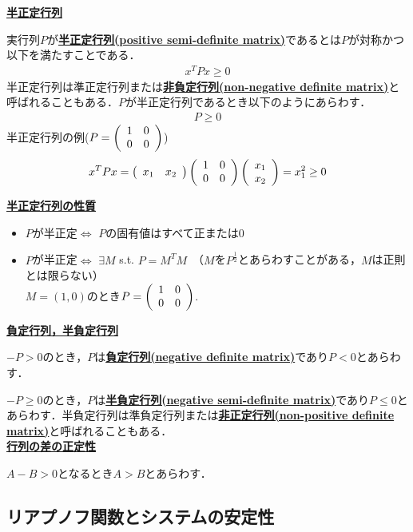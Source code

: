 \noindent
{\bf \underline{半正定行列}}

実行列$P$が{\bf \underline{半正定行列(positive semi-definite matrix)}}であるとは$P$が対称かつ以下を満たすことである．
\begin{eqnarray}
	x^T P x \geq 0
\end{eqnarray}
半正定行列は準正定行列または{\bf \underline{非負定行列(non-negative definite matrix)}}と呼ばれることもある．$P$が半正定行列であるとき以下のようにあらわす．
\begin{eqnarray}
	P \geq 0
\end{eqnarray}
半正定行列の例($ P = \bmatrix{cc} 1 & 0 \\ 0 & 0 \ematrix $)
\begin{eqnarray}
	x^T P x = 
	\bmatrix{cc} x_1 & x_2 \ematrix
	\bmatrix{cc} 1 & 0 \\ 0 & 0 \ematrix
	\bmatrix{c}  x_1 \\ x_2 \ematrix
	=
	x_1^2 \geq 0
\end{eqnarray}

\noindent
{\bf \underline{半正定行列の性質}}
\begin{itemize}
  \item $P$が半正定$\Leftrightarrow$ $P$の固有値はすべて正または$0$
  \item $P$が半正定$\Leftrightarrow$ $\exists M$ s.t. $P = M^T M$　（$M$を$P^{\frac{1}{2}}$とあらわすことがある，$M$は正則とは限らない）\\
  $M=(1,0)$のとき$P=\bmatrix{cc} 1 & 0 \\ 0 & 0 \ematrix$.
\end{itemize}

\noindent
{\bf \underline{負定行列，半負定行列}}

$-P > 0$のとき，$P$は{\bf \underline{負定行列(negative definite matrix)}}であり$P<0$とあらわす．

$-P \geq 0$のとき，$P$は{\bf \underline{半負定行列(negative semi-definite matrix)}}であり$P \leq 0$とあらわす．半負定行列は準負定行列または{\bf \underline{非正定行列(non-positive definite matrix)}}と呼ばれることもある．\\

\noindent
{\bf \underline{行列の差の正定性}}

$A-B>0$となるとき$A>B$とあらわす．


\subsection{リアプノフ関数とシステムの安定性}

